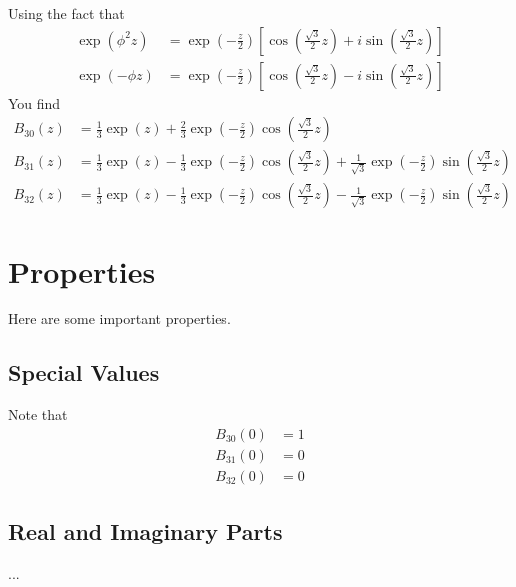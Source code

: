 Using the fact that
\begin{align}
    \exp\left( \phi^{2} z \right) &= \exp\left(-\frac{z}{2}\right) \left[ \cos\left( \frac{\sqrt{3}}{2}z \right) + i \sin\left( \frac{\sqrt{3}}{2}z \right) \right] \\
    \exp\left( -\phi z \right) &= \exp\left(-\frac{z}{2}\right) \left[ \cos\left( \frac{\sqrt{3}}{2}z \right) - i \sin\left( \frac{\sqrt{3}}{2}z \right) \right]
\end{align}
You find
\begin{align}
    B_{30}(z) &= \frac{1}{3} \exp(z) + \frac{2}{3} \exp\left( -\frac{z}{2} \right) \cos\left( \frac{\sqrt{3}}{2} z \right) \\
    B_{31}(z) &= \frac{1}{3} \exp(z) - \frac{1}{3} \exp\left( -\frac{z}{2} \right) \cos\left( \frac{\sqrt{3}}{2} z \right) + \frac{1}{\sqrt{3}} \exp\left( -\frac{z}{2} \right) \sin\left( \frac{\sqrt{3}}{2} z \right) \\
    B_{32}(z) &= \frac{1}{3} \exp(z) - \frac{1}{3} \exp\left( -\frac{z}{2} \right) \cos\left( \frac{\sqrt{3}}{2} z \right) - \frac{1}{\sqrt{3}} \exp\left( -\frac{z}{2} \right) \sin\left( \frac{\sqrt{3}}{2} z \right)
\end{align}
\section{Properties}
Here are some important properties.
\subsection{Special Values}
Note that
\begin{align}
    B_{30}(0) &= 1 \\
    B_{31}(0) &= 0 \\
    B_{32}(0) &= 0
\end{align}
\subsection{Real and Imaginary Parts}
...

